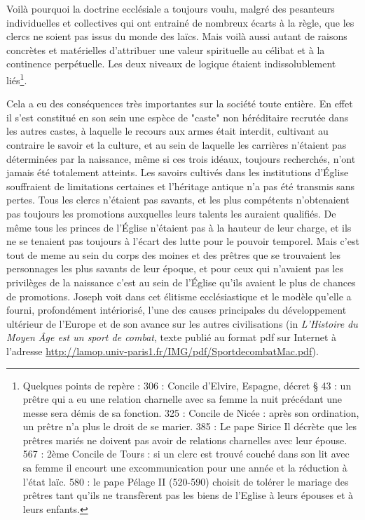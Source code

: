 Voilà pourquoi la doctrine ecclésiale a toujours voulu, malgré des pesanteurs individuelles et collectives qui ont entrainé de nombreux écarts à la règle, que les clercs ne soient pas issus du monde des laïcs. Mais voilà aussi autant de raisons concrètes et matérielles d'attribuer une valeur spirituelle au célibat et à la continence perpétuelle. Les deux niveaux de logique étaient indissolublement liés\footnote{ Quelques points de repère :
 306 : Concile d’Elvire, Espagne, décret § 43 : un prêtre qui a eu une relation charnelle avec sa femme la nuit précédant une messe sera démis de sa fonction.
325 : Concile de Nicée : après son ordination, un prêtre n'a plus le droit de se marier.
385 : Le pape Sirice Il  décrète que les prêtres mariés ne doivent pas avoir de relations charnelles avec leur épouse. 
567 : 2ème Concile de Tours : si un clerc est trouvé couché dans son lit avec sa femme il encourt une excommunication pour une année et la réduction à l’état laïc.
580 :  le pape Pélage II (520-590) choisit de tolérer le mariage des prêtres tant qu’ils ne transfèrent pas les biens de l’Eglise à leurs épouses et à leurs enfants.}.
 
 
 Cela a eu des conséquences très importantes sur la société toute entière. En effet il s'est constitué en son sein une espèce de "caste" non héréditaire recrutée dans les autres castes, à laquelle le recours aux armes était interdit, cultivant au contraire le savoir et la culture, et au sein de laquelle les carrières n'étaient pas déterminées par la naissance, même si ces trois idéaux, toujours recherchés, n'ont jamais été totalement atteints. Les savoirs cultivés dans les institutions d'Église souffraient de limitations certaines et l'héritage antique n'a pas été transmis sans pertes. Tous les clercs n'étaient pas savants, et les plus compétents n'obtenaient pas toujours les promotions auxquelles leurs talents les auraient qualifiés. De même tous les princes de l'Église n'étaient pas à la hauteur de leur charge, et ils ne se tenaient pas toujours à l'écart des lutte pour le pouvoir temporel. Mais c'est tout de meme au sein du corps des moines et des prêtres que se trouvaient les personnages les plus savants de leur époque, et pour ceux qui n'avaient pas les privilèges de la naissance c'est au sein de l'Église qu'ils avaient le plus de chances de promotions. Joseph  voit dans cet élitisme ecclésiastique et le modèle qu'elle a fourni, profondément intériorisé, l'une des causes principales du développement ultérieur de l'Europe et de son avance sur les autres civilisations (in \emph{L'Histoire du Moyen Âge est un sport de combat}, texte publié au format pdf sur Internet à l'adresse \url{http://lamop.univ-paris1.fr/IMG/pdf/SportdecombatMac.pdf}).
 
